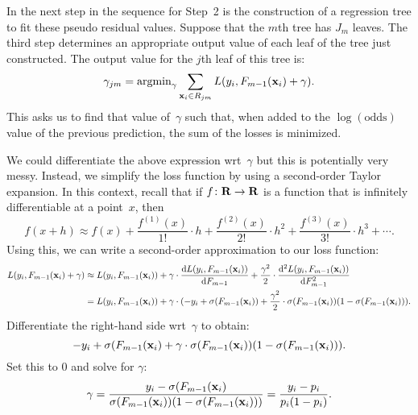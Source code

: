 In the next step in the sequence for Step~2 is the construction of a regression 
tree to fit these pseudo residual values. Suppose that the $m$th tree has $J_m$
leaves. The third step determines an appropriate output value of each leaf of 
the tree just constructed. The output value for the $j$th leaf of this tree 
is:
\begin{equation}
    \gamma_{j m} = \operatorname{argmin}_{\gamma} 
                            \sum_{\mathbf{x}_i \in R_{j m}} L(y_i, F_{m - 1}(\mathbf{x}_i) + \gamma).
\end{equation} 
This asks us to find that value of~$\gamma$ such that, when added to the 
$\log (\text{odds})$ value of the previous prediction, the sum of the losses
is minimized.
  
We could differentiate the above expression wrt~$\gamma$ but this is potentially very messy. 
Instead, we simplify the loss function by using a second-order Taylor expansion. 
In this context, recall that if $f \colon \mathbf{R} \to \mathbf{R}$ is a function that is infinitely
differentiable at a point~$x$, then
\begin{equation}
    f(x + h) \approx f(x) 
                        + \frac{f^{(1)}(x)}{1!} \cdot h 
                        + \frac{f^{(2)}(x)}{2!} \cdot h^{2} 
                        + \frac{f^{(3)}(x)}{3!} \cdot h^{3}
                        + \cdots.
\end{equation}
Using this, we can write a second-order approximation to our loss function:
\begin{align*}
    L(y_i, F_{m - 1}(\mathbf{x}_i) + \gamma) 
            & \approx L(y_i, F_{m - 1}(\mathbf{x}_i)) 
            + \gamma \cdot \frac{\mathrm{d} L(y_i, F_{m - 1}(\mathbf{x}_i))}{\mathrm{d} F_{m-1}} 
            + \frac{\gamma^2}{2} \cdot \frac{\mathrm{d}^2 L(y_i, F_{m - 1}(\mathbf{x}_i))}{\mathrm{d} F_{m-1}^2} \\
            & = L(y_i, F_{m - 1}(\mathbf{x}_i)) 
            + \gamma \cdot (-y_i + \sigma(F_{m - 1}(\mathbf{x}_i)) 
            + \frac{\gamma^2}{2} \cdot \sigma(F_{m - 1}(\mathbf{x}_i)) (1 - \sigma(F_{m - 1}(\mathbf{x}_i))).
\end{align*}
Differentiate the right-hand side wrt~$\gamma$ to obtain:
\begin{equation}
    -y_i + \sigma(F_{m - 1}(\mathbf{x}_i) + \gamma \cdot \sigma(F_{m - 1}(\mathbf{x}_i)) (1 - \sigma(F_{m - 1}(\mathbf{x}_i))).
\end{equation}
Set this to $0$ and solve for $\gamma$:
\begin{equation}
    \gamma = \frac{y_i - \sigma(F_{m - 1}(\mathbf{x}_i)}{\sigma(F_{m - 1}(\mathbf{x}_i)) (1 - \sigma(F_{m - 1}(\mathbf{x}_i)))}
           = \frac{y_i - p_i}{p_i (1 - p_i)}.
\end{equation}

